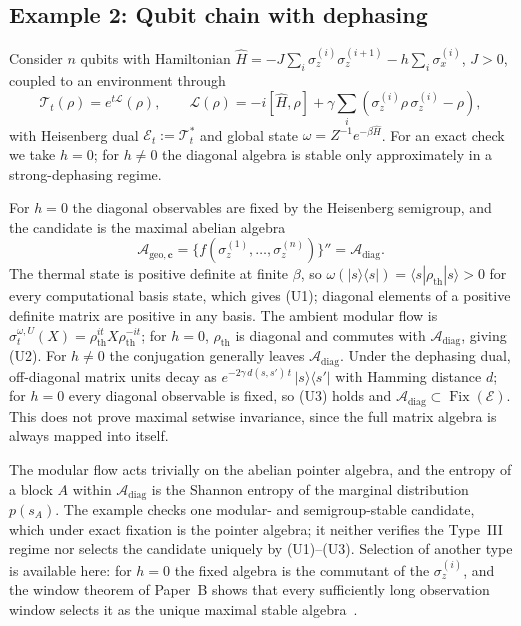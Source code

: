 \documentclass[12pt,a4paper]{article}
\begin{document}
\subsection{Example 2: Qubit chain with dephasing}
\label{sec:qubit}

Consider $n$ qubits with Hamiltonian $\hat{H} = -J \sum_{i} \sigma_z^{(i)} \sigma_z^{(i+1)} - h \sum_{i} \sigma_x^{(i)}$, $J > 0$, coupled to an environment through
\begin{equation}
\label{eq:lindblad}
\mathcal{T}_t(\rho) = e^{t\mathcal{L}}(\rho), \qquad \mathcal{L}(\rho) = -i[\hat{H}, \rho] + \gamma \sum_i \left(\sigma_z^{(i)} \rho\, \sigma_z^{(i)} - \rho\right),
\end{equation}
with Heisenberg dual $\mathcal E_t:=\mathcal T_t^*$ and global state $\omega = Z^{-1} e^{-\beta \hat{H}}$. For an exact check we take $h=0$; for $h\ne0$ the diagonal algebra is stable only approximately in a strong-dephasing regime.

For $h=0$ the diagonal observables are fixed by the Heisenberg semigroup, and the candidate is the maximal abelian algebra
\begin{equation}
\mathcal{A}_{\mathrm{geo},\mathbf{c}} = \{f(\sigma_z^{(1)}, \ldots, \sigma_z^{(n)})\}'' = \mathcal{A}_{\mathrm{diag}}.
\end{equation}
The thermal state is positive definite at finite $\beta$, so $\omega(|s\rangle\langle s|) = \langle s | \rho_{\mathrm{th}} | s \rangle > 0$ for every computational basis state, which gives (U1); diagonal elements of a positive definite matrix are positive in any basis. The ambient modular flow is $\sigma_t^{\omega,U}(X) = \rho_{\mathrm{th}}^{it} X \rho_{\mathrm{th}}^{-it}$; for $h=0$, $\rho_{\mathrm{th}}$ is diagonal and commutes with $\mathcal A_{\mathrm{diag}}$, giving (U2). For $h\ne0$ the conjugation generally leaves $\mathcal A_{\mathrm{diag}}$. Under the dephasing dual, off-diagonal matrix units decay as $e^{-2\gamma\, d(s,s')\, t}\, |s\rangle\langle s'|$ with Hamming distance $d$; for $h=0$ every diagonal observable is fixed, so (U3) holds and $\mathcal A_{\mathrm{diag}}\subset\operatorname{Fix}(\mathcal E)$. This does not prove maximal setwise invariance, since the full matrix algebra is always mapped into itself.

The modular flow acts trivially on the abelian pointer algebra, and the entropy of a block $A$ within $\mathcal{A}_{\mathrm{diag}}$ is the Shannon entropy of the marginal distribution $p(s_A)$. The example checks one modular- and semigroup-stable candidate, which under exact fixation is the pointer algebra; it neither verifies the Type~III regime nor selects the candidate uniquely by (U1)--(U3). Selection of another type is available here: for $h=0$ the fixed algebra is the commutant of the $\sigma_z^{(i)}$, and the window theorem of Paper~B shows that every sufficiently long observation window selects it as the unique maximal stable algebra~\cite{Liu2026PaperB}.
\end{document}
